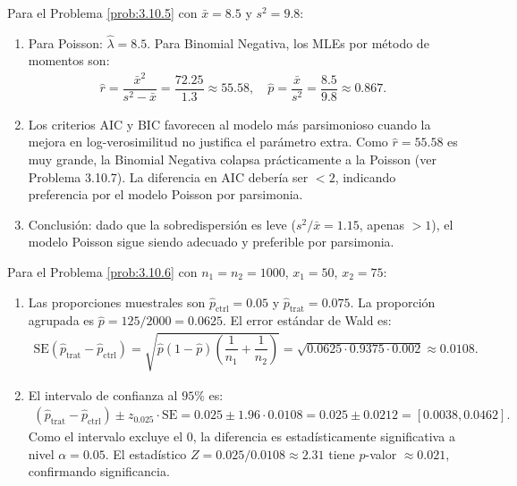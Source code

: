\begin{solucion}
	\label{sol:3.10.5}
	Para el Problema \ref{prob:3.10.5} con $\bar{x} = 8.5$ y $s^{2} = 9.8$:
	\begin{enumerate}
		\item Para Poisson: $\hat{\lambda} = 8.5$. Para Binomial Negativa, los MLEs por método de momentos son:
		\begin{align*}
			\hat{r} = \dfrac{\bar{x}^{2}}{s^{2} - \bar{x}} = \dfrac{72.25}{1.3} \approx 55.58, \quad \hat{p} = \dfrac{\bar{x}}{s^{2}} = \dfrac{8.5}{9.8} \approx 0.867.
		\end{align*}
		\item Los criterios AIC y BIC favorecen al modelo más parsimonioso cuando la mejora en log-verosimilitud no justifica el parámetro extra. Como $\hat{r} = 55.58$ es muy grande, la Binomial Negativa colapsa prácticamente a la Poisson (ver Problema 3.10.7). La diferencia en AIC debería ser $< 2$, indicando preferencia por el modelo Poisson por parsimonia.
		\item Conclusión: dado que la sobredispersión es leve ($s^{2}/\bar{x} = 1.15$, apenas $> 1$), el modelo Poisson sigue siendo adecuado y preferible por parsimonia.
	\end{enumerate}
\end{solucion}

\begin{solucion}
	\label{sol:3.10.6}
	Para el Problema \ref{prob:3.10.6} con $n_{1} = n_{2} = 1000$, $x_{1} = 50$, $x_{2} = 75$:
	\begin{enumerate}
		\item Las proporciones muestrales son $\hat{p}_{\text{ctrl}} = 0.05$ y $\hat{p}_{\text{trat}} = 0.075$. La proporción agrupada es $\hat{p} = 125/2000 = 0.0625$. El error estándar de Wald es:
		\begin{align*}
			\text{SE}(\hat{p}_{\text{trat}} - \hat{p}_{\text{ctrl}}) = \sqrt{\hat{p}(1-\hat{p})\left(\dfrac{1}{n_{1}} + \dfrac{1}{n_{2}}\right)} = \sqrt{0.0625 \cdot 0.9375 \cdot 0.002} \approx 0.0108.
		\end{align*}
		\item El intervalo de confianza al $95\%$ es:
		\begin{align*}
			(\hat{p}_{\text{trat}} - \hat{p}_{\text{ctrl}}) \pm z_{0.025} \cdot \text{SE} = 0.025 \pm 1.96 \cdot 0.0108 = 0.025 \pm 0.0212 = [0.0038, 0.0462].
		\end{align*}
		Como el intervalo excluye el $0$, la diferencia es estadísticamente significativa a nivel $\alpha = 0.05$. El estadístico $Z = 0.025/0.0108 \approx 2.31$ tiene $p$-valor $\approx 0.021$, confirmando significancia.
	\end{enumerate}
\end{solucion}

